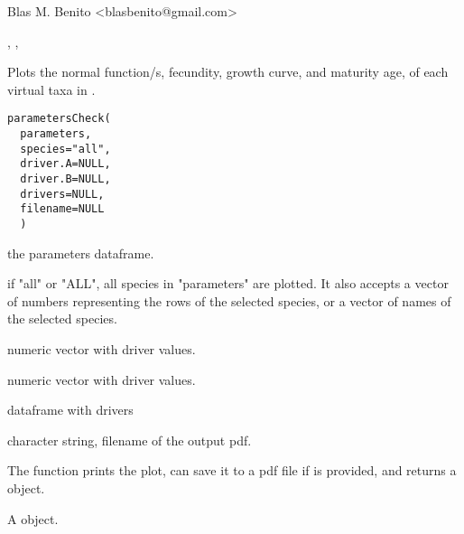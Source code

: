 \documentclass[letterpaper]{book}
\begin{document}
%
\begin{Author}\relax
Blas M. Benito  <blasbenito@gmail.com>
\end{Author}
%
\begin{SeeAlso}\relax
{}, , 
\end{SeeAlso}
%
\begin{Description}\relax
Plots the normal function/s, fecundity, growth curve, and maturity age, of each virtual taxa in .
\end{Description}
%
\begin{Usage}
\begin{verbatim}
parametersCheck(
  parameters,
  species="all",
  driver.A=NULL,
  driver.B=NULL,
  drivers=NULL,
  filename=NULL
  )
\end{verbatim}
\end{Usage}
%
\begin{Arguments}
\begin{ldescription}
\item[\code{parameters}] the parameters dataframe.

\item[\code{species}] if "all" or "ALL", all species in "parameters" are plotted. It also accepts a vector of numbers representing the rows of the selected species, or a vector of names of the selected species.

\item[\code{driver.A}] numeric vector with driver values.

\item[\code{driver.B}] numeric vector with driver values.

\item[\code{drivers}] dataframe with drivers

\item[\code{filename}] character string, filename of the output pdf.
\end{ldescription}
\end{Arguments}
%
\begin{Details}\relax
The function prints the plot, can save it to a pdf file if  is provided, and returns a  object.
\end{Details}
%
\begin{Value}
A  object.
\end{Value}
\end{document}
